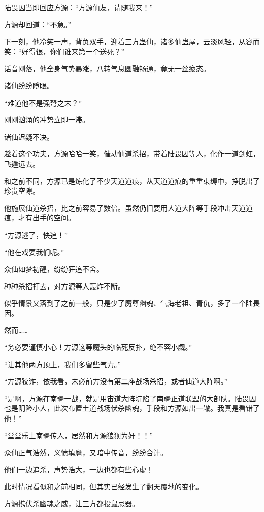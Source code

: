 
\begin{this_body}

陆畏因当即回应方源：“方源仙友，请随我来！”

方源却回道：“不急。”

下一刻，他冷笑一声，背负双手，迎着三方蛊仙，诸多仙蛊屋，云淡风轻，从容而笑：“好得很，你们谁来第一个送死？”

话音刚落，他全身气势暴涨，八转气息圆融畅通，竟无一丝疲态。

诸仙纷纷瞪眼。

“难道他不是强弩之末？”

刚刚汹涌的冲势立即一滞。

诸仙迟疑不决。

趁着这个功夫，方源哈哈一笑，催动仙道杀招，带着陆畏因等人，化作一道剑虹，飞遁远去。

和之前不同，方源已是炼化了不少天道道痕，从天道道痕的重重束缚中，挣脱出了珍贵空隙。

他施展仙道杀招，比之前容易了数倍。虽然仍旧要用人道大阵等手段冲击天道道痕，才有出手的空间。

“方源逃了，快追！”

“他在戏耍我们呢。”

众仙如梦初醒，纷纷狂追不舍。

种种杀招打去，对方源等人轰炸不断。

似乎情景又落到了之前一般，只是少了魔尊幽魂、气海老祖、青仇，多了一个陆畏因。

然而……

“务必要谨慎小心！方源这等魔头的临死反扑，绝不容小觑。”

“让其他两方顶上，我们多留些气力。”

“方源狡诈，依我看，未必前方没有第二座战场杀招，或者仙道大阵啊。”

“是啊，方源在南疆一战，就是用宙道大阵坑陷了南疆正道联盟的大部队。陆畏因也是阴险小人，此次布置土道战场伏杀幽魂，手段和方源如出一辙。我真是看错了他！”

“堂堂乐土南疆传人，居然和方源狼狈为奸！！”

众仙正气浩然，义愤填膺，又暗中传音，纷纷合计。

他们一边追杀，声势浩大，一边也都有些心虚！

此时情况看似和之前相同，但其实已经发生了翻天覆地的变化。

方源携伏杀幽魂之威，让三方都投鼠忌器。


\end{this_body}
